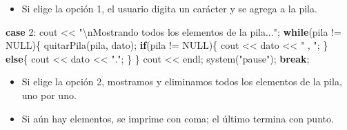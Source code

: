 \documentclass[
  11pt,
  a4paper,
  DIV=11,
  numbers=noendperiod]{scrreprt}
\newenvironment{Shaded}{\begin{snugshade}}{\end{snugshade}}
\newcommand{\ControlFlowTok}[1]{\textcolor[rgb]{0.00,0.23,0.31}{\textbf{#1}}}
\newcommand{\DecValTok}[1]{\textcolor[rgb]{0.68,0.00,0.00}{#1}}
\newcommand{\NormalTok}[1]{\textcolor[rgb]{0.00,0.23,0.31}{#1}}
\newcommand{\OperatorTok}[1]{\textcolor[rgb]{0.37,0.37,0.37}{#1}}
\newcommand{\SpecialCharTok}[1]{\textcolor[rgb]{0.37,0.37,0.37}{#1}}
\newcommand{\StringTok}[1]{\textcolor[rgb]{0.13,0.47,0.30}{#1}}
\providecommand{\tightlist}{%
  \setlength{\itemsep}{0pt}\setlength{\parskip}{0pt}}
\begin{document}
\begin{itemize}
\tightlist
\item
  Si elige la opción 1, el usuario digita un carácter y se agrega a la
  pila.
\end{itemize}

\begin{Shaded}
\begin{Highlighting}[]
            \ControlFlowTok{case} \DecValTok{2}\OperatorTok{:}\NormalTok{ cout }\OperatorTok{\textless{}\textless{}} \StringTok{"}\SpecialCharTok{\textbackslash{}n}\StringTok{Mostrando todos los elementos de la pila..."}\OperatorTok{;}
                    \ControlFlowTok{while}\OperatorTok{(}\NormalTok{pila }\OperatorTok{!=}\NormalTok{ NULL}\OperatorTok{)\{}
\NormalTok{                        quitarPila}\OperatorTok{(}\NormalTok{pila}\OperatorTok{,}\NormalTok{ dato}\OperatorTok{);}
                        \ControlFlowTok{if}\OperatorTok{(}\NormalTok{pila }\OperatorTok{!=}\NormalTok{ NULL}\OperatorTok{)\{}
\NormalTok{                            cout }\OperatorTok{\textless{}\textless{}}\NormalTok{ dato }\OperatorTok{\textless{}\textless{}} \StringTok{" , "}\OperatorTok{;}
                        \OperatorTok{\}}
                        \ControlFlowTok{else}\OperatorTok{\{}
\NormalTok{                            cout }\OperatorTok{\textless{}\textless{}}\NormalTok{ dato }\OperatorTok{\textless{}\textless{}} \StringTok{"."}\OperatorTok{;}
                        \OperatorTok{\}}
                    \OperatorTok{\}}
\NormalTok{                    cout }\OperatorTok{\textless{}\textless{}}\NormalTok{ endl}\OperatorTok{;}
\NormalTok{                    system}\OperatorTok{(}\StringTok{"pause"}\OperatorTok{);}
                    \ControlFlowTok{break}\OperatorTok{;}
\end{Highlighting}
\end{Shaded}

\begin{itemize}
\item
  Si elige la opción 2, mostramos y eliminamos todos los elementos de la
  pila, uno por uno.
\item
  Si aún hay elementos, se imprime con coma; el último termina con
  punto.
\end{itemize}
\end{document}
